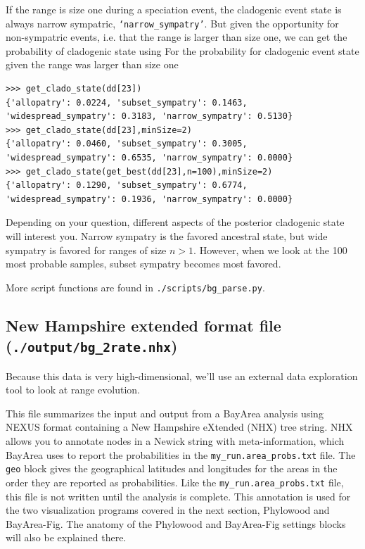 \documentclass[11pt]{article}
\begin{document}
If the range is size one during a speciation event, the cladogenic event state is always narrow sympatric, {\tt `narrow\_sympatry'}.
But given the opportunity for non-sympatric events, i.e. that the range is larger than size one, we can get the probability of cladogenic state using
For the probability for cladogenic event state given the range was larger than size one
\begin{snugshade}
\begin{lstlisting}
>>> get_clado_state(dd[23])
{'allopatry': 0.0224, 'subset_sympatry': 0.1463, 'widespread_sympatry': 0.3183, 'narrow_sympatry': 0.5130}
>>> get_clado_state(dd[23],minSize=2)
{'allopatry': 0.0460, 'subset_sympatry': 0.3005, 'widespread_sympatry': 0.6535, 'narrow_sympatry': 0.0000}
>>> get_clado_state(get_best(dd[23],n=100),minSize=2)
{'allopatry': 0.1290, 'subset_sympatry': 0.6774, 'widespread_sympatry': 0.1936, 'narrow_sympatry': 0.0000}
\end{lstlisting}
\end{snugshade}

Depending on your question, different aspects of the posterior cladogenic state will interest you.
Narrow sympatry is the favored ancestral state, but wide sympatry is favored for ranges of size $n>1$.
However, when we look at the 100 most probable samples, subset sympatry becomes most favored.

More script functions are found in {\tt ./scripts/bg\_parse.py}.

\subsection{New Hampshire extended format file (\texttt{./output/bg\_2rate.nhx})}

Because this data is very high-dimensional, we'll use an external data exploration tool to look at range evolution.

This file summarizes the input and output from a BayArea analysis using NEXUS format containing a New Hampshire eXtended (NHX) tree string.
NHX allows you to annotate nodes in a Newick string with meta-information, which BayArea uses to report the probabilities in the \texttt{my\_run.area\_probs.txt} file.
The \texttt{geo} block gives the geographical latitudes and longitudes for the areas in the order they are reported as probabilities.
Like the \texttt{my\_run.area\_probs.txt} file, this file is not written until the analysis is complete.
This annotation is used for the two visualization programs covered in the next section, Phylowood and BayArea-Fig.
The anatomy of the Phylowood and BayArea-Fig settings blocks will also be explained there.
\end{document}
